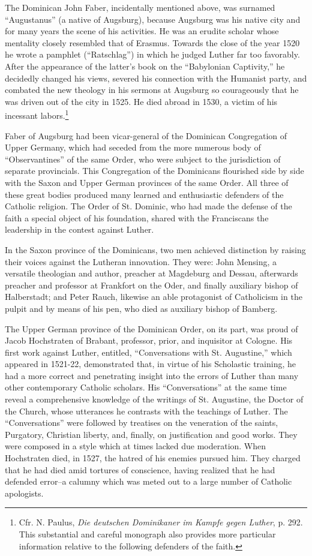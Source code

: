 The Dominican John Faber, incidentally mentioned above, was
surnamed “Augustanus” (a native of Augsburg), because Augsburg
was his native city and for many years the scene of his activities. He
was an erudite scholar whose mentality closely resembled that of
Erasmus. Towards the close of the year 1520 he wrote a pamphlet
(“Ratschlag”) in which he judged Luther far too favorably. After
the appearance of the latter’s book on the “Babylonian Captivity,”
he decidedly changed his views, severed his connection with the Humanist
party, and combated the new theology in his sermons at Augsburg so courageously
that he was driven out of the city in 1525. He
died abroad in 1530, a victim of his incessant labors.\footnote
{Cfr. N. Paulus, \textit{Die deutschen Dominikaner im Kampfe gegen Luther}, p. 292. This
substantial and careful monograph also provides more particular information relative to
the following defenders of the faith.}

Faber of Augsburg had been vicar-general of the Dominican Congregation
of Upper Germany, which had seceded from the more
numerous body of “Observantines” of the same Order, who were
subject to the jurisdiction of separate provincials. This Congregation
of the Dominicans flourished side by side with the Saxon and
Upper German provinces of the same Order. All three of these great
bodies produced many learned and enthusiastic defenders of the
Catholic religion. The Order of St. Dominic, who had made the defense
of the faith a special object of his foundation, shared with the
Franciscans the leadership in the contest against Luther.

In the Saxon province of the Dominicans, two men achieved distinction by
raising their voices against the Lutheran innovation.
They were: John Mensing, a versatile theologian and author, preacher
at Magdeburg and Dessau, afterwards preacher and professor at
Frankfort on the Oder, and finally auxiliary bishop of Halberstadt;
and Peter Rauch, likewise an able protagonist of Catholicism in the
pulpit and by means of his pen, who died as auxiliary bishop of Bamberg.

The Upper German province of the Dominican Order, on its part,
was proud of Jacob Hochstraten of Brabant, professor, prior, and
inquisitor at Cologne. His first work against Luther, entitled, “Conversations
with St. Augustine,” which appeared in 1521-22, demonstrated that, in virtue
of his Scholastic training, he had a more correct and penetrating insight
into the errors of Luther than many
other contemporary Catholic scholars. His “Conversations” at the
same time reveal a comprehensive knowledge of the writings of St.
Augustine, the Doctor of the Church, whose utterances he contrasts
with the teachings of Luther. The “Conversations” were followed by
treatises on the veneration of the saints, Purgatory, Christian liberty,
and, finally, on justification and good works. They were composed
in a style which at times lacked due moderation. When Hochstraten
died, in 1527, the hatred of his enemies pursued him. They charged
that he had died amid tortures of conscience, having realized that he
had defended error--a calumny which was meted out to a large number of
Catholic apologists.

